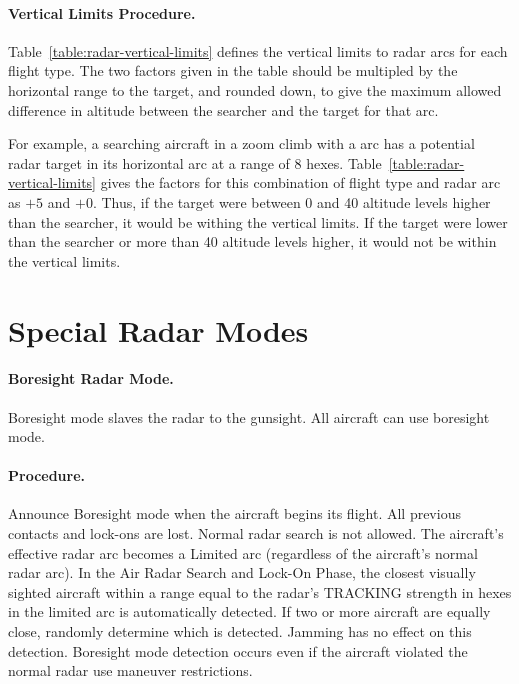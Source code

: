 \begin{advancedrules}
{\paragraph{Vertical Limits Procedure.} Table~\ref{table:radar-vertical-limits} defines the vertical limits to radar arcs for each flight type. The two factors given in the table should be multipled by the horizontal range to the target, and rounded down, to give the maximum allowed difference in altitude between the searcher and the target for that arc.

For example, a searching aircraft in a zoom climb with a  arc has a potential radar target in its horizontal arc at a range of 8 hexes. Table~\ref{table:radar-vertical-limits} gives the factors for this combination of flight type and radar arc as $+5$ and $+0$. Thus, if the target were between 0 and 40 altitude levels higher than the searcher, it would be withing the vertical limits. If the target were lower than the searcher or more than 40 altitude levels higher, it would not be within the vertical limits.
}

\section{Special Radar Modes}
\label{rule:special-radar-modes}
\label{rule:boresight-mode}

\paragraph{Boresight Radar Mode.} Boresight mode slaves the radar to the gunsight. All aircraft can use boresight mode.  

\paragraph{Procedure.} Announce Boresight mode when the aircraft begins its flight. All previous contacts and lock-ons are lost. Normal radar search is not allowed. The aircraft's effective radar arc becomes a Limited arc (regardless of the aircraft's normal radar arc). In the Air Radar Search and Lock-On Phase, the closest visually sighted aircraft within a range equal to the radar's TRACKING strength in hexes in the limited arc is automatically detected. If two or more aircraft are equally close, randomly determine which is detected. Jamming has no effect on this detection. Boresight mode detection occurs even if the aircraft violated the normal radar use maneuver restrictions.


\end{advancedrules}
